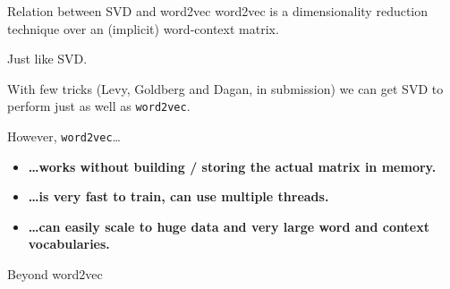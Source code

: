 \documentclass[compress]{beamer}
\begin{document}
\begin{frame}{Relation between SVD and word2vec}
word2vec is a dimensionality reduction technique over an (implicit) word-context
matrix.

\vspace{1em}

Just like SVD.

\vspace{1em}
With few tricks {\footnotesize(Levy, Goldberg and Dagan, in submission)}
we can get SVD to perform just as well as \texttt{word2vec}.

\pause
\vspace{1em}
However, \texttt{word2vec}\ldots

\begin{itemize}
    \item \textbf{\ldots works without building / storing the actual matrix in memory.}
    \item \textbf{\ldots is very fast to train, can use multiple threads.}
    \item \textbf{\ldots can easily scale to huge data and very large word
and context vocabularies.}
\end{itemize}
\end{frame}


\begin{frame}{}
    \centering
    Beyond word2vec

\end{frame}
\end{document}
